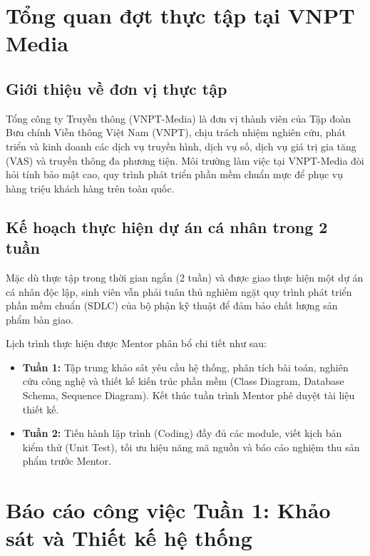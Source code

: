 \documentclass[12pt,a4paper]{article}
\begin{document}

\section{Tổng quan đợt thực tập tại VNPT Media}

\subsection{Giới thiệu về đơn vị thực tập}

Tổng công ty Truyền thông (VNPT-Media) là đơn vị thành viên của Tập đoàn Bưu chính Viễn thông Việt Nam (VNPT), chịu trách nhiệm nghiên cứu, phát triển và kinh doanh các dịch vụ truyền hình, dịch vụ số, dịch vụ giá trị gia tăng (VAS) và truyền thông đa phương tiện. Môi trường làm việc tại VNPT-Media đòi hỏi tính bảo mật cao, quy trình phát triển phần mềm chuẩn mực để phục vụ hàng triệu khách hàng trên toàn quốc.

\subsection{Kế hoạch thực hiện dự án cá nhân trong 2 tuần}

Mặc dù thực tập trong thời gian ngắn (2 tuần) và được giao thực hiện một dự án cá nhân độc lập, sinh viên vẫn phải tuân thủ nghiêm ngặt quy trình phát triển phần mềm chuẩn (SDLC) của bộ phận kỹ thuật để đảm bảo chất lượng sản phẩm bàn giao.

Lịch trình thực hiện được Mentor phân bổ chi tiết như sau:
\begin{itemize}
    \item \textbf{Tuần 1:} Tập trung khảo sát yêu cầu hệ thống, phân tích bài toán, nghiên cứu công nghệ và thiết kế kiến trúc phần mềm (Class Diagram, Database Schema, Sequence Diagram). Kết thúc tuần trình Mentor phê duyệt tài liệu thiết kế.
    \item \textbf{Tuần 2:} Tiến hành lập trình (Coding) đầy đủ các module, viết kịch bản kiểm thử (Unit Test), tối ưu hiệu năng mã nguồn và báo cáo nghiệm thu sản phẩm trước Mentor.
\end{itemize}

\newpage

\section{Báo cáo công việc Tuần 1: Khảo sát và Thiết kế hệ thống}
\end{document}
